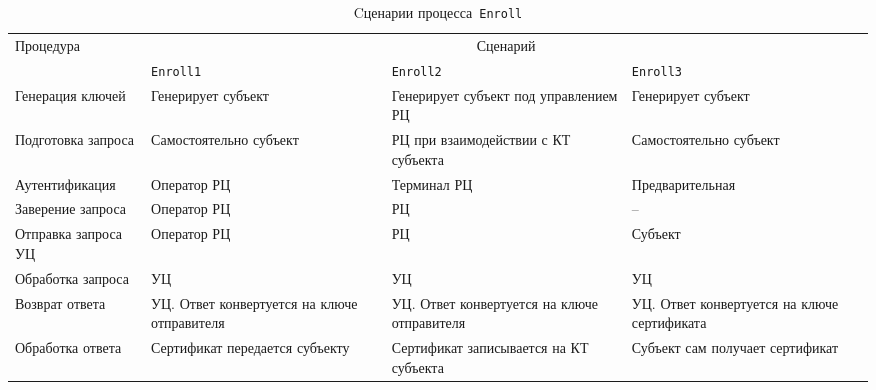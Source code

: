 \begin{table}[bht]
\caption{Cценарии процесса~\texttt{Enroll}} 
\label{Table.ENROLL.Summary}
\begin{tabular}{|p{3.2cm}|p{4cm}|p{4cm}|p{4cm}|}
\hline
Процедура & \multicolumn{3}{|c|}{Сценарий}\\
\cline{2-4}
&\texttt{Enroll1}&\texttt{Enroll2}&\texttt{Enroll3}\\
\hline
\hline
Генерация ключей & 
Генерирует субъект & 
Генерирует субъект под управлением РЦ &
Генерирует субъект\\
\hline
%
Подготовка запроса & 
Самостоятельно субъект & 
РЦ при взаимодействии с КТ субъекта &
Самостоятельно субъект\\
\hline
%
Аутентификация & 
Оператор РЦ &
Терминал РЦ & 
Предварительная\\
\hline
%
Заверение запроса & 
Оператор РЦ &
РЦ & 
--\\
\hline
%
Отправка запроса УЦ & 
Оператор РЦ &
РЦ & 
Субъект\\
\hline
%
Обработка запроса & 
УЦ &
УЦ & 
УЦ\\
\hline
%
Возврат ответа & 
УЦ. Ответ конвертуется на ключе отправителя &
УЦ. Ответ конвертуется на ключе отправителя &
УЦ. Ответ конвертуется на ключе сертификата\\
\hline
%
Обработка ответа & 
Сертификат передается субъекту &
Сертификат записывается на КТ субъекта &
Субъект сам получает сертификат\\
\hline
\end{tabular}
\end{table}

